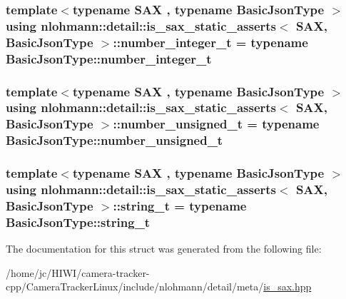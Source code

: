 \subsubsection[{\texorpdfstring{number\+\_\+integer\+\_\+t}{number_integer_t}}]{\setlength{\rightskip}{0pt plus 5cm}template$<$typename S\+AX , typename Basic\+Json\+Type $>$ using {\bf nlohmann\+::detail\+::is\+\_\+sax\+\_\+static\+\_\+asserts}$<$ S\+AX, Basic\+Json\+Type $>$\+::{\bf number\+\_\+integer\+\_\+t} =  typename Basic\+Json\+Type\+::number\+\_\+integer\+\_\+t\hspace{0.3cm}{\ttfamily [private]}}\hypertarget{structnlohmann_1_1detail_1_1is__sax__static__asserts_a474adf99bf1eaa8292284fd3064c80fe}{}\label{structnlohmann_1_1detail_1_1is__sax__static__asserts_a474adf99bf1eaa8292284fd3064c80fe}
\subsubsection[{\texorpdfstring{number\+\_\+unsigned\+\_\+t}{number_unsigned_t}}]{\setlength{\rightskip}{0pt plus 5cm}template$<$typename S\+AX , typename Basic\+Json\+Type $>$ using {\bf nlohmann\+::detail\+::is\+\_\+sax\+\_\+static\+\_\+asserts}$<$ S\+AX, Basic\+Json\+Type $>$\+::{\bf number\+\_\+unsigned\+\_\+t} =  typename Basic\+Json\+Type\+::number\+\_\+unsigned\+\_\+t\hspace{0.3cm}{\ttfamily [private]}}\hypertarget{structnlohmann_1_1detail_1_1is__sax__static__asserts_af8733df7fcaebb25434285885db7f127}{}\label{structnlohmann_1_1detail_1_1is__sax__static__asserts_af8733df7fcaebb25434285885db7f127}
\subsubsection[{\texorpdfstring{string\+\_\+t}{string_t}}]{\setlength{\rightskip}{0pt plus 5cm}template$<$typename S\+AX , typename Basic\+Json\+Type $>$ using {\bf nlohmann\+::detail\+::is\+\_\+sax\+\_\+static\+\_\+asserts}$<$ S\+AX, Basic\+Json\+Type $>$\+::{\bf string\+\_\+t} =  typename Basic\+Json\+Type\+::string\+\_\+t\hspace{0.3cm}{\ttfamily [private]}}\hypertarget{structnlohmann_1_1detail_1_1is__sax__static__asserts_a067c98d2145bb54d862f4794ac1287bb}{}\label{structnlohmann_1_1detail_1_1is__sax__static__asserts_a067c98d2145bb54d862f4794ac1287bb}


The documentation for this struct was generated from the following file\+:\begin{DoxyCompactItemize}
\item 
/home/jc/\+H\+I\+W\+I/camera-\/tracker-\/cpp/\+Camera\+Tracker\+Linux/include/nlohmann/detail/meta/\hyperlink{is__sax_8hpp}{is\+\_\+sax.\+hpp}\end{DoxyCompactItemize}
